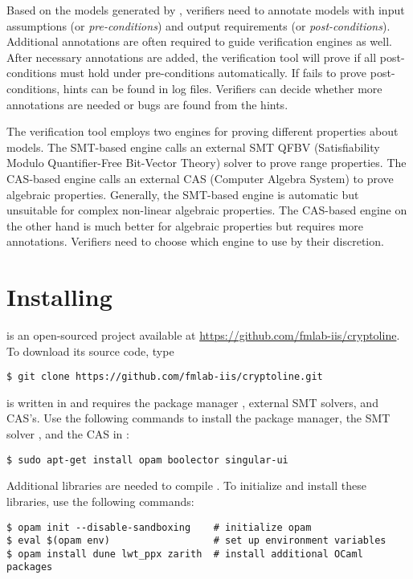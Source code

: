 \documentclass{amsproc}
\begin{document}
Based on the \cryptoline models generated by \tozdsl, verifiers need to
annotate models with input assumptions (or \emph{pre-conditions}) and
output requirements (or \emph{post-conditions}). Additional
annotations are often required to guide \cryptoline verification
engines as well. After necessary annotations are added, the \cryptoline
verification tool will prove if all post-conditions must hold under
pre-conditions automatically. If \cryptoline fails to prove
post-conditions, hints can be found in \cryptoline log files.
Verifiers can decide whether more annotations are needed or bugs are
found from the hints.

The \cryptoline verification tool employs two engines for proving
different properties about \cryptoline models. The SMT-based engine
calls an external SMT QFBV (Satisfiability Modulo Quantifier-Free
Bit-Vector Theory) solver to prove range properties. The CAS-based
engine calls an external CAS (Computer Algebra System) to prove
algebraic properties. Generally, the SMT-based engine is automatic but
unsuitable for complex non-linear algebraic properties. The CAS-based
engine on the other hand is much better for algebraic properties but
requires more annotations. Verifiers need to choose which engine to
use by their discretion. 

\section{Installing \cryptoline}

\cryptoline is an open-sourced project available at
\url{https://github.com/fmlab-iis/cryptoline}. To download its source
code, type
\begin{verbatim}
$ git clone https://github.com/fmlab-iis/cryptoline.git
\end{verbatim}

\cryptoline is written in \ocaml and requires the \ocaml package
manager \opam, external SMT solvers, and CAS's. Use the following
commands to install the \opam package manager, the SMT solver
\boolector, and the CAS \singular in \ubuntu:
\begin{verbatim}
$ sudo apt-get install opam boolector singular-ui 
\end{verbatim}

Additional \ocaml libraries are needed to compile \cryptoline. To
initialize \opam and install these libraries, use the following
commands:
\begin{verbatim}
$ opam init --disable-sandboxing    # initialize opam
$ eval $(opam env)                  # set up environment variables
$ opam install dune lwt_ppx zarith  # install additional OCaml packages
\end{verbatim}
\end{document}
